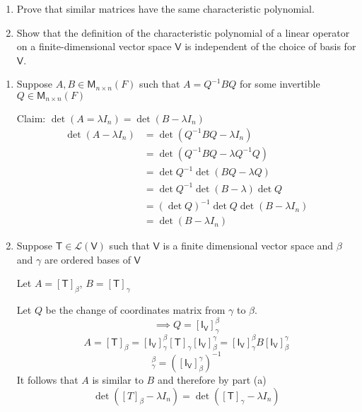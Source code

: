 \begin{enumerate}
\item Prove that similar matrices have the same characteristic
  polynomial.
\item Show that the definition of the characteristic polynomial of a
  linear operator on a finite-dimensional vector space $\mathsf{V}$ is
  independent of the choice of basis for $\mathsf{V}$.
\end{enumerate}
\begin{enumerate}
\item
Suppose $A,B \in \mathsf{M}_{n\times n}(F)$ such that $A=Q^{-1}BQ$ for
some invertible $Q \in \mathsf{M}_{n\times n}(F)$

Claim: $\det{(A=\lambda I_n)} = \det{(B-\lambda I_n)}$
\begin{align}
\det{(A -\lambda I_n)} &= \det{(Q^{-1}BQ - \lambda I_n)}\\
&=\det{(Q^{-1}BQ -\lambda Q^{-1}Q)}\\
&=\det{Q^{-1}}\det{(BQ -\lambda Q)}\\
&=\det{Q^{-1}}\det{(B -\lambda )}\det{Q}\\
&=(\det{Q})^{-1}\det{Q}\det{(B-\lambda I_n)}\\
&=\det{(B-\lambda I_n)}
\end{align}
\item Suppose $ \mathsf{T} \in \mathcal{L}(\mathsf{V})$ such that
  $\mathsf{V}$ is a finite dimensional vector space and $\beta$ and $\gamma$ are
  ordered bases of $\mathsf{V}$ 

Let $A = [\mathsf{T}]_\beta$, $B =[\mathsf{T}]_\gamma$ 

Let $Q$ be the change of coordinates matrix from $\gamma$ to $\beta$.
\begin{equation}
\implies Q = [\mathsf{I}_\mathsf{V}]_\gamma^\beta
\end{equation}
\begin{equation}
A = [\mathsf{T}]_\beta =
[\mathsf{I}_\mathsf{V}]_\gamma^\beta[\mathsf{T}]_\gamma[\mathsf{I}_\mathsf{V}]_\beta^\gamma
= [\mathsf{I}_\mathsf{V}]_\gamma^\beta B[\mathsf{I}_\mathsf{V}]_\beta^\gamma
\end{equation}
\begin{equation}
[\mathsf{I}_\mathsf{V}]_\gamma^\beta = ([\mathsf{I}_\mathsf{V}]^\gamma_\beta)^{-1}
\end{equation}
It follows that $A$ is similar to $B$ and therefore by part (a)
\begin{equation}
\det{([T]_\beta-\lambda I_n)} = \det{([\mathsf{T}]_\gamma - \lambda I_n)}
\end{equation}
\end{enumerate}
